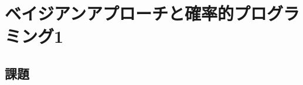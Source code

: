\documentclass{ltjsbook}
\begin{document}
 
\chapter{ベイジアンアプローチと確率的プログラミング1}
\label{chapter19} 


\section{課題}
\end{document}
